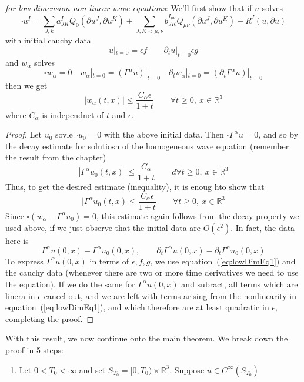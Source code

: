 \documentclass{book}
\newenvironment{Proof}[1][]
  {\begin{ProofTcb}[#1]}
  {\end{ProofTcb}}
\newcommand{\R}{{\mathbb{R}}}
\begin{document}
\begin{Proof}
	\emph{for low dimension non-linear wave equations}: We'll first show that if $u$ solves
	\begin{equation}\label{eq:lowDimEq1}
	  \square u^I = \sum_{J, k} a_{JK}^I Q_0( \partial u^J, \partial u^K  ) + \sum_{J, K< \mu, \nu}
	  b_{JK}^{I_{\mu\nu}} Q_{\mu\nu}( \partial u^J, \partial u^K ) + R^I(u, \partial u)
	\end{equation}
	with initial cauchy data
\[
	u|_{t=0} = \epsilon f\qquad \partial_t u|_{t= 0} \epsilon g
\]
	and $w_\alpha$ solves
	\[
		\square w_\alpha = 0 \quad w_\alpha|_{t=0} = (\Gamma^\alpha u)|_{t=0} \quad \partial_t w_\alpha|_{t=0}
		= ( \partial_t \Gamma^\alpha u)|_{t=0}
	\]
	then we get
	\[
		|w_\alpha(t, x)| \le \frac{C_\alpha \epsilon}{1 + t} \qquad \forall t \ge 0,\ x \in \R^3
	\]
	where $C_\alpha$ is independnet of $t$ and $\epsilon$.
	\begin{proof}
		Let $u_0$ sovle $\square u_0 = 0$ with the above initial data. Then $\square \Gamma^\alpha u = 0$, and
		so by the decay estimate for solutiosn of the homogeneous wave equation (remember the result
		from the chapter)
		\[
		|\Gamma^\alpha u_0(t, x)| \le \frac{C_\alpha}{1+t} \qquad d\forall t\ge 0,\ x \in \R^3
		\]
		Thus, to get the desired estimate (inequality), it is enoug hto show that
		\[
			|\Gamma^\alpha u_0(t,x) \le \frac{C_\alpha \epsilon}{1+t} \qquad \forall t \ge 0,\
			x \in \R^3
		\]
		Since $\square (w_\alpha - \Gamma^\alpha u_0) = 0$, this estimate again follows from the decay property
		we used above, if we just observe that the initial data are $O(\epsilon^2)$. In fact, the data here is
		\[
			\Gamma^\alpha u(0, x) - \Gamma^\alpha u_0(0, x), \qquad \partial_t \Gamma^\alpha u(0, x)
			- \partial_t \Gamma^\alpha u_0(0, x)
		\]
		To express $\Gamma^\alpha u(0, x)$ in terms of $\epsilon, f, g$, we use equation~(\ref{eq:lowDimEq1})
		and the cauchy data (whenever there are two or more time derivatives we need to use the equation). If we
		do the same for $\Gamma^\alpha u(0, x)$ and subract, all terms which are linera in $\epsilon$ cancel
		out, and we are left with terms arising from the nonlinearity in equation~(\ref{eq:lowDimEq1}),
		and which therefore are at least quadratic in $\epsilon$, completing the proof.
	\end{proof}
	With this result, we now continue onto the main theorem. We break down the proof in 5 steps:
	\begin{enumerate}
		\item Let $0 < T_0 < \infty$ and set $S_{T_0} = [0, T_0) \times \R^3$. Suppose $u \in C^\infty(S_{T_0})$

\end{enumerate}
\end{Proof}
\end{document}
